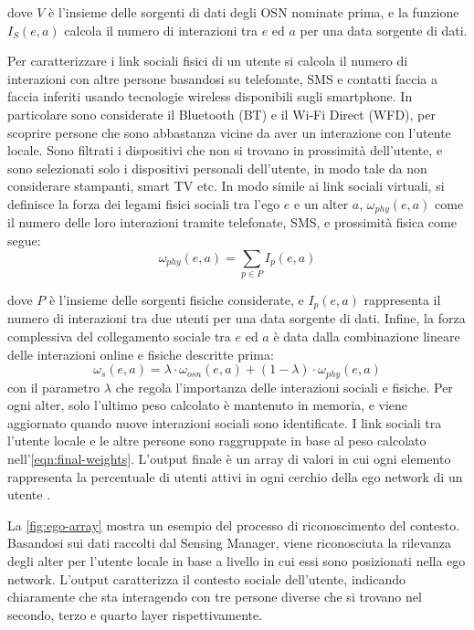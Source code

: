 \documentclass[12pt,italian]{report}
\begin{document}
dove $V$ è l'insieme delle sorgenti di dati degli OSN nominate prima, e la funzione $I_S (e, a)$ calcola il numero di interazioni tra $e$ ed $a$ per una data sorgente di dati. 

Per caratterizzare i link sociali fisici di un utente si calcola il numero di interazioni con altre persone basandosi su telefonate, SMS e contatti faccia a faccia inferiti usando tecnologie wireless disponibili sugli smartphone. In particolare sono considerate il Bluetooth (BT) e il Wi-Fi Direct (WFD), per scoprire persone che sono abbastanza vicine da aver un interazione con l'utente locale. Sono filtrati i dispositivi che non si trovano in prossimità dell'utente, e sono selezionati solo i dispositivi personali dell'utente, in modo tale da non considerare stampanti, smart TV etc. In modo simile ai link sociali virtuali, si definisce la forza dei legami fisici sociali tra l'ego $e$ e un alter $a$, $\omega_{phy}(e, a)$ come il numero delle loro interazioni tramite telefonate, SMS, e prossimità fisica come segue:
\begin{equation}
	\omega_{phy}(e, a) = \sum_{p \in P}I_p(e,a)
\end{equation}

dove $P$ è l'insieme delle sorgenti fisiche considerate, e $I_p(e,a)$ rappresenta il numero di interazioni tra due utenti per una data sorgente di dati. Infine, la forza complessiva del collegamento sociale tra $e$ ed $a$ è data dalla combinazione lineare delle interazioni online e fisiche descritte prima:
\begin{equation}
\label{eqn:final-weights}
	\omega_s(e,a) = \lambda \cdot \omega_{osn}(e,a) + (1 - \lambda)
	\cdot \omega_{phy}(e,a)
\end{equation}
con il parametro $\lambda$ che regola l'importanza delle interazioni sociali e fisiche. Per ogni alter, solo l'ultimo peso calcolato è mantenuto in memoria, e viene aggiornato quando nuove interazioni sociali sono identificate. I link sociali tra l'utente locale e le altre persone sono raggruppate in base al peso calcolato nell'\autoref{eqn:final-weights}. L'output finale è un array di valori in cui ogni elemento rappresenta la percentuale di utenti attivi in ogni cerchio della ego network di un utente \cite{ego-net}. 

La \autoref{fig:ego-array} mostra un esempio del processo di riconoscimento del contesto. Basandosi sui dati raccolti dal Sensing Manager, viene riconosciuta la rilevanza degli alter per l'utente locale in base a livello in cui essi sono posizionati nella ego network. L'output caratterizza il contesto sociale dell'utente, indicando chiaramente che sta interagendo con tre persone diverse che si trovano nel secondo, terzo e quarto layer rispettivamente.
\end{document}

